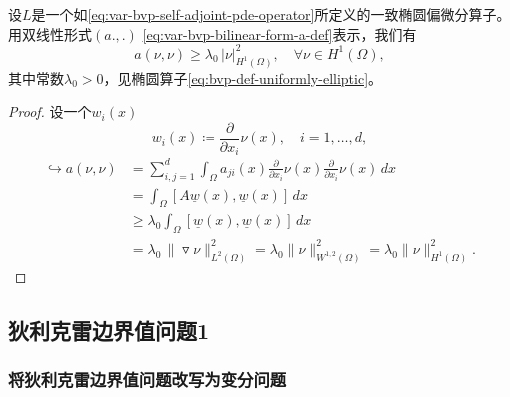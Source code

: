 \begin{lemma}[双线性算子的半椭圆特性]
  \label{lemma:var-bvp-operator-ellipticity-property}
  设$L$是一个如\eqref{eq:var-bvp-self-adjoint-pde-operator}所定义的一致椭圆偏微分算子。用双线性形式$(a.,.)$ \eqref{eq:var-bvp-bilinear-form-a-def}表示，我们有
  \begin{equation}
    \label{eq:var-bvp-bilinear-a-nunu}
    a(\nu,\nu) \ge \lambda_0 \, \big| \nu \big|_{H^{1}(\Omega)}^2, \quad \forall \nu \in H^{1}(\Omega),
  \end{equation}
  其中常数$\lambda_0 > 0$，见椭圆算子\eqref{eq:bvp-def-uniformly-elliptic}。
\end{lemma}

\begin{proof}
  设一个$w_i(x)$
  \begin{equation*}
    w_i(x) \coloneqq \frac{\partial}{\partial x_i} \nu(x), \quad i=1,\ldots,d,
  \end{equation*}
  \begin{equation*}
    \begin{split}
      \hookrightarrow a(\nu, \nu) & = \sum_{i,j=1}^{d} \int_{\Omega}
      a_{ji}(x) \frac{\partial}{\partial x_i} \nu(x) \frac{\partial}{\partial x_i} \nu(x)  \, dx \\
      &= \int_{\Omega} \left[ A \underline{w}(x), \underline{w}(x) \right] \, dx \\
      & \ge \lambda_0 \int_{\Omega} \left[ \underline{w}(x), \underline{w}(x) \right] \, dx \\
      & = \lambda_0 \, \big\| \triangledown \nu \big\|_{L^{2}(\Omega)}^2
      = \lambda_0 \big\| \nu \big\|_{W^{1,2}(\Omega)}^2
      = \lambda_0 \big\| \nu \big\|_{H^1(\Omega)}^2.
    \end{split}
  \end{equation*}
\end{proof}

\subsection{狄利克雷边界值问题1}
\label{sec:var-bvp-dirichlet}

\subsubsection{将狄利克雷边界值问题改写为变分问题}

